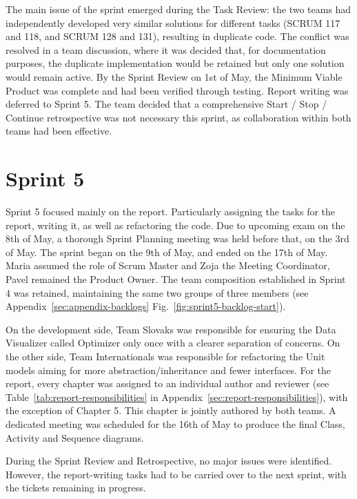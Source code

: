 The main issue of the sprint emerged during the Task Review: the two teams had independently developed very similar solutions for different tasks (SCRUM 117 and 118, and SCRUM 128 and 131), resulting in duplicate code. The conflict was resolved in a team discussion, where it was decided that, for documentation purposes, the duplicate implementation would be retained but only one solution would remain active. By the Sprint Review on 1st of May, the Minimum Viable Product was complete and had been verified through testing. Report writing was deferred to Sprint 5. The team decided that a comprehensive Start / Stop / Continue retrospective was not necessary this sprint, as collaboration within both teams had been effective.

\section{Sprint 5}
\label{sec:sprint5}

Sprint 5 focused mainly on the report. Particularly assigning the tasks for the report, writing it, as well as refactoring the code. Due to upcoming exam on the 8th of May, a thorough Sprint Planning meeting was held before that, on the 3rd of May. The sprint began on the 9th of May, and ended on the 17th of May. Maria assumed the role of Scrum Master and Zoja the Meeting Coordinator, Pavel remained the Product Owner. The team composition established in Sprint 4 was retained, maintaining the same two groups of three members (see Appendix~\ref{sec:appendix-backlogs} Fig.~\ref{fig:sprint5-backlog-start}).

On the development side, Team Slovaks was responsible for ensuring the Data Visualizer called Optimizer only once with a clearer separation of concerns. On the other side, Team Internationals was responsible for refactoring the Unit models aiming for more abstraction/inheritance and fewer interfaces. For the report, every chapter was assigned to an individual author and reviewer (see Table~\ref{tab:report-responsibilities} in Appendix~\ref{sec:report-responsibilities}), with the exception of Chapter 5. This chapter is jointly authored by both teams. A dedicated meeting was scheduled for the 16th of May to produce the final Class, Activity and Sequence diagrams.

During the Sprint Review and Retrospective, no major issues were identified. However, the report-writing tasks had to be carried over to the next sprint, with the tickets remaining in progress.

